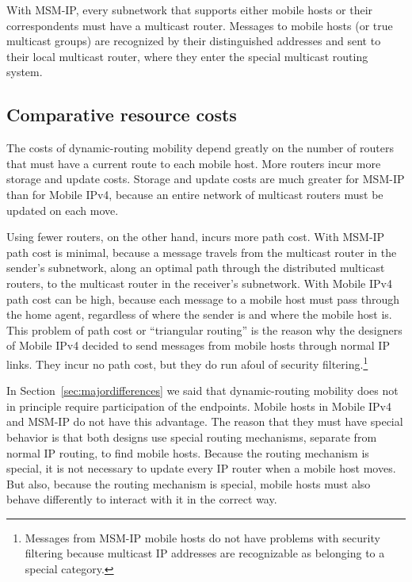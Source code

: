 With MSM-IP, every subnetwork that supports either mobile hosts or
their correspondents must have a multicast router.
Messages to mobile hosts (or true multicast groups) are recognized
by their distinguished addresses and sent to their local multicast
router, where they enter the special multicast routing 
system.

\subsection{Comparative resource costs}

The costs of dynamic-routing mobility depend greatly on the number
of routers that must have a current route to each mobile host.
More routers incur more storage and update costs.
Storage and update costs are much greater for MSM-IP than for Mobile IPv4,
because an entire network of multicast routers must be updated on each
move.

Using fewer routers, on the other hand, incurs more path cost.
With MSM-IP path cost is minimal, because a message travels from the
multicast router in the sender's subnetwork, along an optimal path 
through the distributed multicast routers, to the multicast router in
the receiver's subnetwork.
With Mobile IPv4 path cost can be high, because each message to a mobile
host must pass through the home agent, regardless of where the sender
is and where the mobile host is.
This problem of path cost or ``triangular routing'' is the reason why
the designers of Mobile IPv4 decided to send messages from mobile hosts
through normal IP links.
They incur no path cost, but they do run afoul of security
filtering.\footnote{Messages from MSM-IP mobile hosts do not have
problems with security filtering because multicast IP addresses are
recognizable as belonging to a special category.}

In Section~\ref{sec:majordifferences} we said that dynamic-routing
mobility does not in principle require participation of the endpoints.
Mobile hosts in Mobile IPv4 and MSM-IP do not have this advantage.
The reason that they must have special behavior is that both designs
use special routing mechanisms, separate from normal IP
routing, to find mobile hosts.
Because the routing mechanism is special, it is not necessary to
update every IP router when a mobile host moves.
But also, because the routing mechanism is special, mobile hosts must also
behave differently to interact with it in the correct way.
